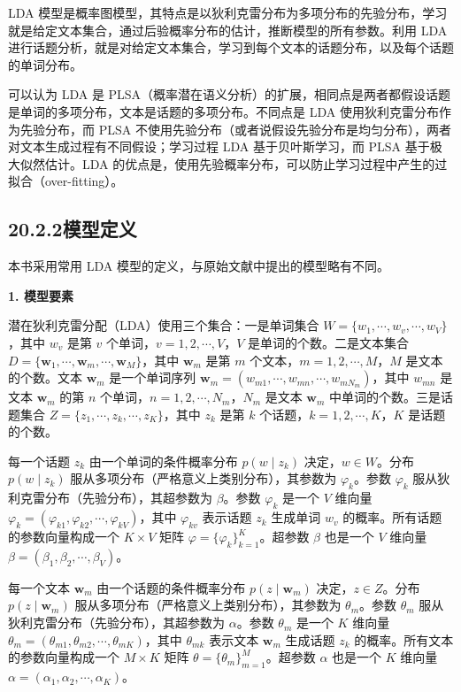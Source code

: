 \documentclass[UTF8,12pt,a4paper,fontset=fandol]{ctexart}
\begin{document}
LDA 模型是概率图模型，其特点是以狄利克雷分布为多项分布的先验分布，学习就是给定文本集合，通过后验概率分布的估计，推断模型的所有参数。利用 LDA 进行话题分析，就是对给定文本集合，学习到每个文本的话题分布，以及每个话题的单词分布。

可以认为 LDA 是 PLSA（概率潜在语义分析）的扩展，相同点是两者都假设话题是单词的多项分布，文本是话题的多项分布。不同点是 LDA 使用狄利克雷分布作为先验分布，而 PLSA 不使用先验分布（或者说假设先验分布是均匀分布），两者对文本生成过程有不同假设；学习过程 LDA 基于贝叶斯学习，而 PLSA 基于极大似然估计。LDA 的优点是，使用先验概率分布，可以防止学习过程中产生的过拟合（over-fitting）。

\subsection*{20.2.2\quad 模型定义}

本书采用常用 LDA 模型的定义，与原始文献中提出的模型略有不同。

\noindent\textbf{1. 模型要素}

潜在狄利克雷分配（LDA）使用三个集合：一是单词集合 $W=\{w_1,\cdots,w_v,\cdots,w_V\}$，其中 $w_v$ 是第 $v$ 个单词，$v=1,2,\cdots,V$，$V$ 是单词的个数。二是文本集合 $D=\{\mathbf{w}_1,\cdots,\mathbf{w}_m,\cdots,\mathbf{w}_M\}$，其中 $\mathbf{w}_m$ 是第 $m$ 个文本，$m=1,2,\cdots,M$，$M$ 是文本的个数。文本 $\mathbf{w}_m$ 是一个单词序列 $\mathbf{w}_m=(w_{m1},\cdots,w_{mn},\cdots,w_{mN_m})$，其中 $w_{mn}$ 是文本 $\mathbf{w}_m$ 的第 $n$ 个单词，$n=1,2,\cdots,N_m$，$N_m$ 是文本 $\mathbf{w}_m$ 中单词的个数。三是话题集合 $Z=\{z_1,\cdots,z_k,\cdots,z_K\}$，其中 $z_k$ 是第 $k$ 个话题，$k=1,2,\cdots,K$，$K$ 是话题的个数。

每一个话题 $z_k$ 由一个单词的条件概率分布 $p(w\mid z_k)$ 决定，$w\in W$。分布 $p(w\mid z_k)$ 服从多项分布（严格意义上类别分布），其参数为 $\varphi_k$。参数 $\varphi_k$ 服从狄利克雷分布（先验分布），其超参数为 $\beta$。参数 $\varphi_k$ 是一个 $V$ 维向量 $\varphi_k=(\varphi_{k1},\varphi_{k2},\cdots,\varphi_{kV})$，其中 $\varphi_{kv}$ 表示话题 $z_k$ 生成单词 $w_v$ 的概率。所有话题的参数向量构成一个 $K\times V$ 矩阵 $\varphi=\{\varphi_k\}_{k=1}^K$。超参数 $\beta$ 也是一个 $V$ 维向量 $\beta=(\beta_1,\beta_2,\cdots,\beta_V)$。

每一个文本 $\mathbf{w}_m$ 由一个话题的条件概率分布 $p(z\mid \mathbf{w}_m)$ 决定，$z\in Z$。分布 $p(z\mid \mathbf{w}_m)$ 服从多项分布（严格意义上类别分布），其参数为 $\theta_m$。参数 $\theta_m$ 服从狄利克雷分布（先验分布），其超参数为 $\alpha$。参数 $\theta_m$ 是一个 $K$ 维向量 $\theta_m=(\theta_{m1},\theta_{m2},\cdots,\theta_{mK})$，其中 $\theta_{mk}$ 表示文本 $\mathbf{w}_m$ 生成话题 $z_k$ 的概率。所有文本的参数向量构成一个 $M\times K$ 矩阵 $\theta=\{\theta_m\}_{m=1}^M$。超参数 $\alpha$ 也是一个 $K$ 维向量 $\alpha=(\alpha_1,\alpha_2,\cdots,\alpha_K)$。
\end{document}

